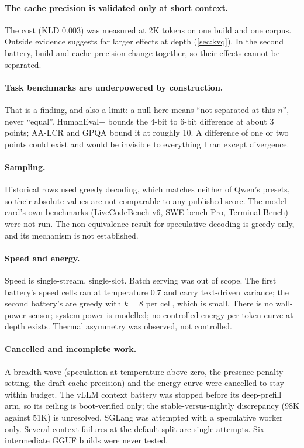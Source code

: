 \paragraph{The cache precision is validated only at short context.} The  cost (KLD 0.003)
was measured at 2K tokens on one build and one corpus. Outside evidence suggests far larger effects at
depth (\cref{sec:kvq}). In the second battery, build and cache precision change together, so their
effects cannot be separated.

\paragraph{Task benchmarks are underpowered by construction.} That is a finding, and also a limit: a
null here means ``not separated at this $n$'', never ``equal''. HumanEval+ bounds the 4-bit to 6-bit
difference at about 3 points; AA-LCR and GPQA bound it at roughly 10. A difference of one or two points
could exist and would be invisible to everything I ran except divergence.

\paragraph{Sampling.} Historical rows used greedy decoding, which matches neither of Qwen's presets, so
their absolute values are not comparable to any published score. The model card's own benchmarks
(LiveCodeBench v6, SWE-bench Pro, Terminal-Bench) were not run. The non-equivalence result for
speculative decoding is greedy-only, and its mechanism is not established.

\paragraph{Speed and energy.} Speed is single-stream, single-slot. Batch serving was out of scope. The
first battery's speed cells ran at temperature 0.7 and carry text-driven variance; the second
battery's are greedy with $k=8$ per cell, which is small. There is no wall-power sensor; system power
is modelled; no controlled energy-per-token curve at depth exists. Thermal asymmetry was observed, not
controlled.

\paragraph{Cancelled and incomplete work.} A breadth wave (speculation at temperature above zero, the
presence-penalty setting, the draft cache precision) and the energy curve were cancelled to stay
within budget. The vLLM context battery was stopped before its deep-prefill arm, so its ceiling is
boot-verified only; the stable-versus-nightly discrepancy (98K against 51K) is unresolved. SGLang was
attempted with a speculative worker only. Several context failures at the default split are single
attempts. Six intermediate GGUF builds were never tested.

